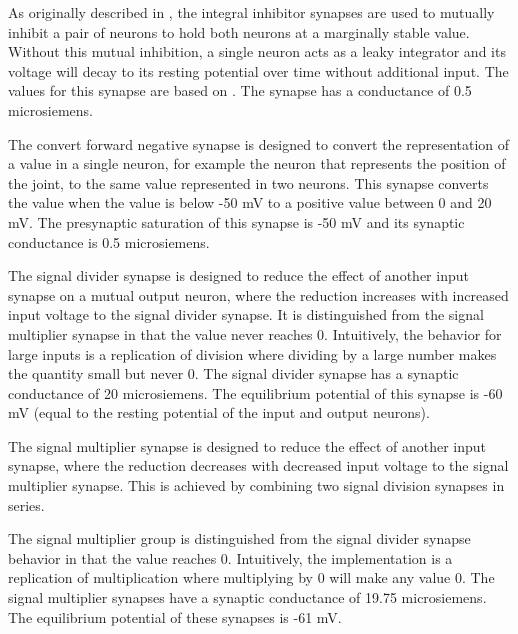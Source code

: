 
As originally described in \cite{NickFunctionalSubnetwork}, the integral inhibitor synapses are used to mutually inhibit a pair of neurons to hold both 
neurons at a marginally stable value. Without this mutual inhibition, a single neuron acts
as a leaky integrator and its voltage will decay to its resting potential over time without additional input.  The values for this
synapse are based on \cite{NickFunctionalSubnetwork}. The synapse has a  
conductance of 0.5 microsiemens.


The convert forward negative synapse is designed to convert the representation
of a value in a single neuron, for example the neuron that represents the 
position of the joint, to the same value represented in two neurons. This
synapse converts the value when the value is below -50 mV to a positive value 
between 0 and 20 mV. The presynaptic
saturation of this synapse is -50 mV and its synaptic conductance is 0.5 microsiemens.


The signal divider synapse is designed to reduce the effect of another input
synapse on a mutual output neuron, where the reduction increases with increased input voltage to the
signal divider synapse. It is distinguished from the signal multiplier synapse
in that the value never reaches 0. Intuitively, the behavior for large inputs is a replication of 
division where dividing by a large number makes the quantity small but never 0.
The signal divider synapse has a synaptic conductance of 20 microsiemens. The equilibrium potential of
this synapse is -60 mV (equal to the resting potential of the input and output
neurons).


The signal multiplier synapse is designed to reduce the effect of another input
synapse, where the reduction decreases with decreased input voltage to the
signal multiplier synapse.  This is achieved by combining two signal division synapses in series.

The signal multiplier group is distinguished from the signal divider synapse
behavior in that the value reaches 0. Intuitively, the implementation is a replication of 
multiplication where multiplying by 0 will make any value 0.
The signal multiplier synapses have a synaptic conductance of 19.75 microsiemens. The equilibrium potential 
of these synapses is -61 mV.

